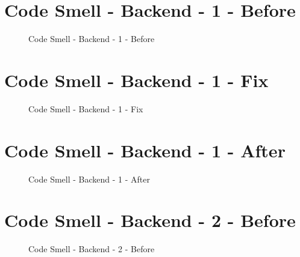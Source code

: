 %	
%
\section{Code Smell - Backend - 1 - Before} \label{a.4.backend.codesmell1.before}
\begin{figure}[h]
	\centering
	\caption{Code Smell - Backend - 1 - Before}
	\label{a.1.aggregate}
\end{figure}

\section{Code Smell - Backend - 1 - Fix} \label{a.4.backend.codesmell1.fix}
\begin{figure}[h]
	\centering
	\caption{Code Smell - Backend - 1 - Fix}
	\label{a.1.aggregate}
\end{figure}

\newpage

\section{Code Smell - Backend - 1 - After} \label{a.4.backend.codesmell1.after}
\begin{figure}[h]
	\centering
	\caption{Code Smell - Backend - 1 - After}
	\label{a.1.aggregate}
\end{figure}

\newpage

\section{Code Smell - Backend - 2 - Before} \label{a.4.backend.codesmell2.before}
\begin{figure}[h]
	\centering
	\caption{Code Smell - Backend - 2 - Before}
	\label{a.1.aggregate}
\end{figure}

